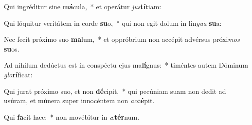\item Qui ingréditur sine \textbf{má}cula,~* et operátur \textit{jus}\textbf{tí}tiam:
\item Qui lóquitur veritátem in corde \textbf{su}o,~* qui non egit dolum in lin\textit{gua} \textbf{su}a:
\item Nec fecit próximo suo \textbf{ma}lum,~* et oppróbrium non accépit advérsus próxi\textit{mos} \textbf{su}os.
\item Ad níhilum dedúctus est in conspéctu ejus ma\textbf{lí}gnus:~* timéntes autem Dóminum \textit{glo}\textbf{rí}ficat:
\item Qui jurat próximo suo, et non \textbf{dé}cipit,~* qui pecúniam suam non dedit ad usúram, et múnera super innocéntem non \textit{ac}\textbf{cé}pit.
\item Qui \textbf{fa}cit hæc:~* non movébitur in \textit{æ}\textbf{tér}num.
